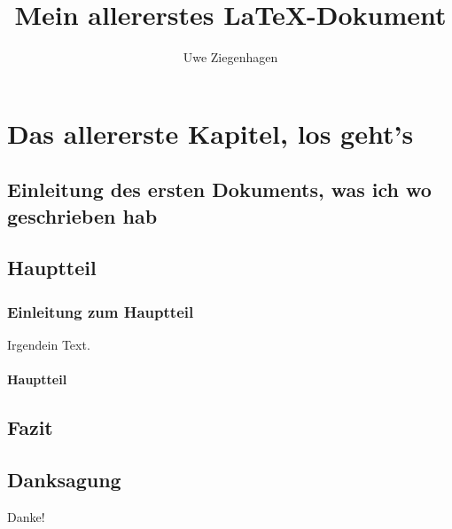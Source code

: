 \documentclass[12pt,ngerman]{scrbook}
\author{Uwe Ziegenhagen}
\title{Mein allererstes \LaTeX-Dokument}
\begin{document}
\maketitle

\tableofcontents

\chapter{Das allererste Kapitel, los geht's}

\section{Einleitung des ersten Dokuments, was ich wo geschrieben hab}

\blindtext

\section{Hauptteil}

\subsection{Einleitung zum Hauptteil}

Irgendein Text.

\subsubsection{Hauptteil}


\blindtext[2]

\blindtext[2]


\section{Fazit}

\blindtext[100]


\section{Danksagung}

Danke!
\end{document}
